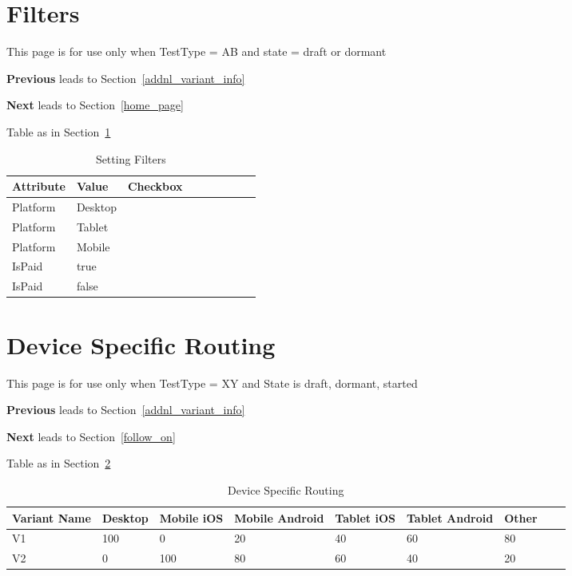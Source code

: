 \documentclass[letterpaper]{article}
\begin{document}
\section{Filters}
\label{filters}
This page is for use only when TestType = AB and state = draft or dormant
\be
\item {\bf Previous} leads to Section~\ref{addnl_variant_info}
\item {\bf Next} leads to Section~\ref{home_page}
\item Table as in Section~\ref{tbl_filters}
  \ee
\begin{table}[hb]
\centering
\begin{tabular}{|l|l|l|l|l|l|l|l|l|}  \hline \hline
  {\bf Attribute} &   {\bf Value} & {\bf Checkbox} \\ \hline \hline
  Platform & Desktop & \\ \hline
  Platform & Tablet & \\ \hline
  Platform & Mobile & \\ \hline
  \hline
  IsPaid & true & \\ \hline
  IsPaid & false & \\ \hline
\hline
\end{tabular}
\caption{Setting Filters}
\label{tbl_filters}
\end{table}

\section{Device Specific Routing}
\label{device_specific}
This page is for use only when TestType = XY and State is draft, dormant,
started
\be
\item {\bf Previous} leads to Section~\ref{addnl_variant_info}
\item {\bf Next} leads to Section~\ref{follow_on}
\item Table as in Section~\ref{tbl_device_specific}
  \ee
\begin{table}[hb]
\centering
\begin{tabular}{|l||l|l|l|l|l|l|l|l|}  \hline \hline
  {\bf Variant Name} & 
  {\bf Desktop} & 
  {\bf Mobile iOS}  &
  {\bf Mobile Android}  & 
  {\bf Tablet iOS}  & 
  Tablet {\bf Android}  &
  Other \\ \hline \hline
  V1 & 100  & 0   & 20 & 40 & 60 & 80 \\ \hline
  V2 & 0    & 100 &  80 & 60 & 40 & 20 \\ \hline
\hline
\end{tabular}
\caption{Device Specific Routing}
\label{tbl_device_specific}
\end{table}
\end{document}
